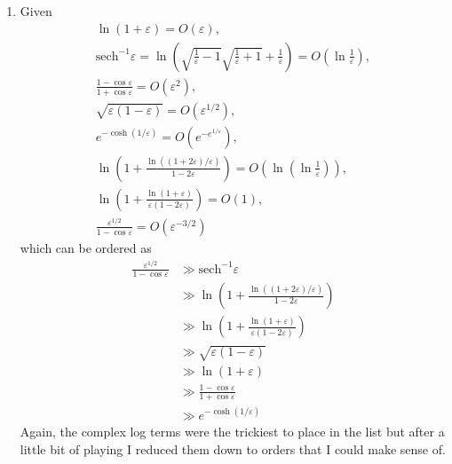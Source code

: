 \documentclass[a4paper,12pt]{article}
\newcommand{\eps}{\varepsilon}
\newcommand{\sech}{\mathrm{sech}}
\begin{document}
\begin{enumerate}[label = \arabic*)]
\begin{enumerate}[label = (\alph*)]
		\newpage
		\item Given
		\begin{gather*}
			\ln(1 + \eps) = O(\eps), \\
			\sech^{-1}\eps = \ln \left(\sqrt{\frac{1}{\eps}-1} \sqrt{\frac{1}{\eps}+1}+\frac{1}{\eps}\right) = O\left(\ln \frac{1}{\eps}\right), \\
			\frac{1 - \cos \eps}{1 + \cos \eps} = O(\eps^2), \\
			\sqrt{\eps(1 - \eps)} = O(\eps^{1/2}), \\
			e^{-\cosh(1/\eps)} = O(e^{-e^{1/\eps}}), \\
			\ln\left(1 + \frac{\ln((1+2\eps)/\eps)}{1-2\eps}\right) = O\left(\ln\left(\ln \frac{1}{\eps}\right)\right), \\
			\ln\left(1 + \frac{\ln(1+\eps)}{\eps(1-2\eps)}\right) = O(1), \\
			\frac{\eps^{1/2}}{1 - \cos \eps} = O(\eps^{-3/2})
		\end{gather*} 
		which can be ordered as
		\begin{align*}
			\frac{\eps^{1/2}}{1 - \cos \eps} &\gg \sech^{-1}\eps \\
			&\gg \ln\left(1 + \frac{\ln((1+2\eps)/\eps)}{1-2\eps}\right) \\
			&\gg \ln\left(1 + \frac{\ln(1+\eps)}{\eps(1-2\eps)}\right) \\
			&\gg \sqrt{\eps(1 - \eps)} \\
			&\gg \ln(1 + \eps) \\
			&\gg \frac{1- \cos \eps}{1 + \cos \eps} \\
			&\gg e^{-\cosh(1 / \eps)}
		\end{align*}
		Again, the complex log terms were the trickiest to place in the list but after a little bit of playing I reduced them down to orders that I could make sense of.
	\end{enumerate}
\end{enumerate}
\end{document}
